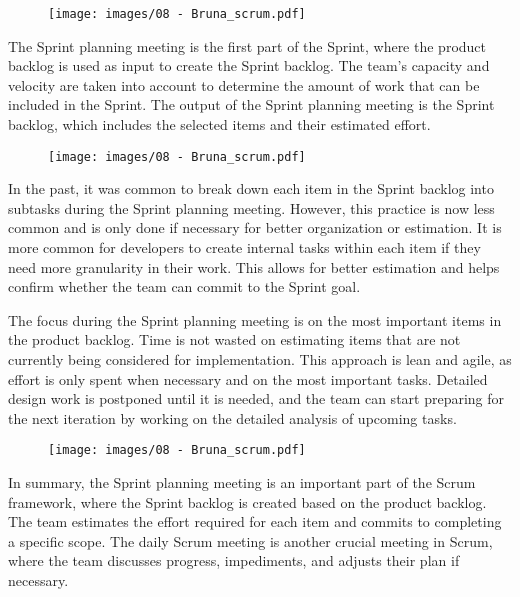 \begin{figure}[!h]
  \centering
  \texttt{[image: images/08 - Bruna\_scrum.pdf]}
\end{figure}

The Sprint planning meeting is the first part of the Sprint, where the
product backlog is used as input to create the Sprint backlog. The
team's capacity and velocity are taken into account to determine the
amount of work that can be included in the Sprint. The output of the
Sprint planning meeting is the Sprint backlog, which includes the
selected items and their estimated effort.

\begin{figure}[!h]
  \centering
  \texttt{[image: images/08 - Bruna\_scrum.pdf]}
\end{figure}

In the past, it was common to break down each item in the Sprint backlog
into subtasks during the Sprint planning meeting. However, this practice
is now less common and is only done if necessary for better organization
or estimation. It is more common for developers to create internal tasks
within each item if they need more granularity in their work. This
allows for better estimation and helps confirm whether the team can
commit to the Sprint goal.

The focus during the Sprint planning meeting is on the most important
items in the product backlog. Time is not wasted on estimating items
that are not currently being considered for implementation. This
approach is lean and agile, as effort is only spent when necessary and
on the most important tasks. Detailed design work is postponed until it
is needed, and the team can start preparing for the next iteration by
working on the detailed analysis of upcoming tasks.

\begin{figure}[!h]
  \centering
  \texttt{[image: images/08 - Bruna\_scrum.pdf]}
\end{figure}

In summary, the Sprint planning meeting is an important part of the
Scrum framework, where the Sprint backlog is created based on the
product backlog. The team estimates the effort required for each item
and commits to completing a specific scope. The daily Scrum meeting is
another crucial meeting in Scrum, where the team discusses progress,
impediments, and adjusts their plan if necessary.

